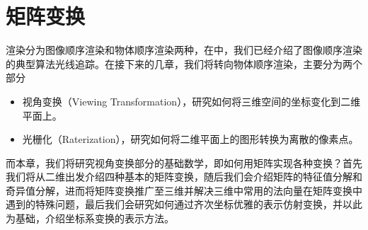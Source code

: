 \chapter{矩阵变换}
渲染分为图像顺序渲染和物体顺序渲染两种，在中，我们已经介绍了图像顺序渲染的典型算法光线追踪。在接下来的几章，我们将转向物体顺序渲染，主要分为两个部分
\begin{itemize}
    \item 视角变换（Viewing Transformation），研究如何将三维空间的坐标变化到二维平面上。
    \item 光栅化（Raterization），研究如何将二维平面上的图形转换为离散的像素点。
\end{itemize}
而本章，我们将研究视角变换部分的基础数学，即如何用矩阵实现各种变换？首先我们将从二维出发介绍四种基本的矩阵变换，随后我们会介绍矩阵的特征值分解和奇异值分解，进而将矩阵变换推广至三维并解决三维中常用的法向量在矩阵变换中遇到的特殊问题，最后我们会研究如何通过齐次坐标优雅的表示仿射变换，并以此为基础，介绍坐标系变换的表示方法。





